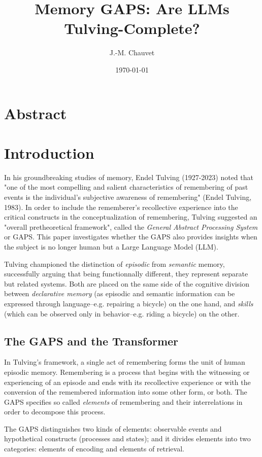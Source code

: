 \documentclass[11pt]{article}
\author{J.-M. Chauvet}
\date{\today}
\title{Memory GAPS: Are LLMs Tulving-Complete?}
\begin{document}
\maketitle

\section*{Abstract}
\label{sec:org16358fb}
\section*{Introduction}
\label{sec:org5832e2c}
In his groundbreaking studies of memory, Endel Tulving (1927-2023) noted that "one of the most compelling and salient characteristics of remembering of past events is the individual's subjective awareness of remembering" (Endel Tulving, 1983). In order to include the rememberer's recollective experience into the critical constructs in the conceptualization of remembering, Tulving suggested an "overall pretheoretical framework", called the \emph{General Abstract Processing System} or GAPS. This paper investigates whether the GAPS also provides insights when the subject is no longer human but a Large Language Model (LLM).

Tulving championed the distinction of \emph{episodic} from \emph{semantic} memory, successfully arguing that being functionnally different, they represent separate but related systems. Both are placed on the same side of the cognitive division between \emph{declarative memory} (as episodic and semantic information can be expressed through language--e.g. repairing a bicycle) on the one hand, and \emph{skills} (which can be observed only in behavior--e.g. riding a bicycle) on the other.

\subsection*{The GAPS and the Transformer}
\label{sec:org9d30808}
In Tulving's framework, a single act of remembering forms the unit of human episodic memory. Remembering is a process that begins with the witnessing or experiencing of an episode and ends with its recollective experience or with the conversion of the remembered information into some other form, or both. The GAPS specifies so called \emph{elements} of remembering and their interrelations in order to decompose this process.

The GAPS distinguishes two kinds of elements: observable events and hypothetical constructs (processes and states); and it divides elements into two categories: elements of encoding and elements of retrieval.
\end{document}
